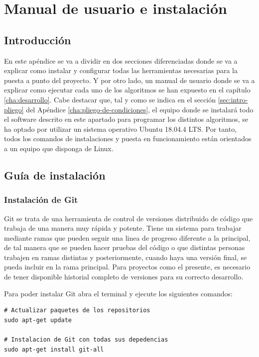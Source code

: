 
\chapter{Manual de usuario e instalación}
\label{cha:manual-usuario-instalacion}

\section{Introducción}
\label{sec:intro-manual-de-usuario}

En este apéndice se va a dividir en dos secciones diferenciadas donde se va a explicar como instalar y configurar todas las herramientas necesarias para la puesta a punto del proyecto. Y por otro lado, un manual de usuario donde se va a explicar como ejecutar cada uno de los algoritmos se han expuesto en el capítulo \ref{cha:desarrollo}.
Cabe destacar que, tal y como se indica en el sección \ref{sec:intro-pliego} del Apéndice \ref{cha:pliego-de-condiciones}, el equipo donde se instalará todo el software descrito en este apartado para programar los distintos algoritmos, se ha optado por utilizar un sistema operativo Ubuntu 18.04.4 LTS. Por tanto, todos los comandos de instalaciones y puesta en funcionamiento están orientados a un equipo que disponga de Linux.


\section{Guía de instalación}
\label{sec:sec-guia-instalacion}

\subsection{Instalación de Git}
\label{subsec:instalacion-git}

Git se trata de una herramienta de control de versiones distribuido de código que trabaja de una manera muy rápida y potente. Tiene un sistema para trabajar mediante ramas que pueden seguir una linea de progreso diferente a la principal, de tal manera que se pueden hacer pruebas del código o que distintas personas trabajen en ramas distintas y posteriormente, cuando haya una versión final, se pueda incluir en la rama principal. Para proyectos como el presente, es necesario de tener disponible historial completo de versiones para su correcto desarrollo.

Para poder instalar Git abra el terminal y ejecute los siguientes comandos:

\vspace{0.5cm}
\begin{lstlisting}[language=iPython,caption=Instalación de Git,captionpos=b,label={lst:install-git}]
# Actualizar paquetes de los repositorios
sudo apt-get update

# Instalacion de Git con todas sus depedencias
sudo apt-get install git-all
\end{lstlisting}

